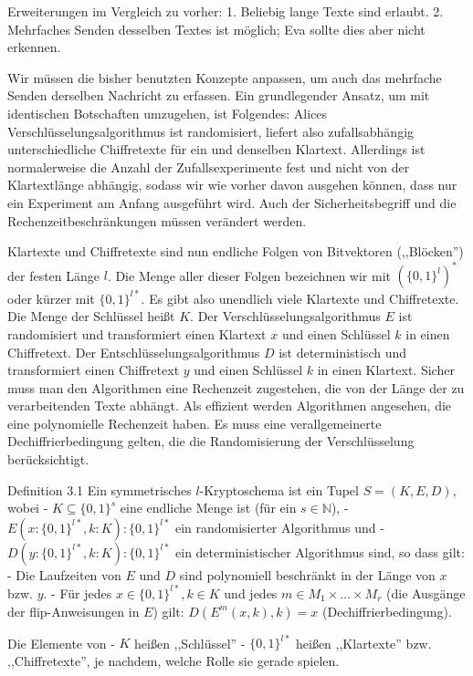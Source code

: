 \documentclass[a4paper]{article}
\begin{document}
\begin{multicols}{3}
    Erweiterungen im Vergleich zu vorher:
    1. Beliebig lange Texte sind erlaubt.
    2. Mehrfaches Senden desselben Textes ist möglich; Eva sollte dies aber nicht erkennen.

    Wir müssen die bisher benutzten Konzepte anpassen, um auch das mehrfache Senden derselben Nachricht zu erfassen. Ein grundlegender Ansatz, um mit identischen Botschaften umzugehen, ist Folgendes: Alices Verschlüsselungsalgorithmus ist randomisiert, liefert also zufallsabhängig unterschiedliche Chiffretexte für ein und denselben Klartext. Allerdings ist normalerweise die Anzahl der Zufallsexperimente fest und nicht von der Klartextlänge abhängig, sodass wir wie vorher davon ausgehen können, dass nur ein Experiment am Anfang ausgeführt wird. Auch der Sicherheitsbegriff und die Rechenzeitbeschränkungen müssen verändert werden.

    Klartexte und Chiffretexte sind nun endliche Folgen von Bitvektoren (,,Blöcken'') der festen Länge $l$. Die Menge aller dieser Folgen bezeichnen wir mit $(\{0,1\}^l)^*$ oder kürzer mit $\{0,1\}^{l*}$. Es gibt also unendlich viele Klartexte und Chiffretexte. Die Menge der Schlüssel heißt $K$. Der Verschlüsselungsalgorithmus $E$ ist randomisiert und transformiert einen Klartext $x$ und einen Schlüssel $k$ in einen Chiffretext. Der Entschlüsselungsalgorithmus $D$ ist deterministisch und transformiert einen Chiffretext $y$ und einen Schlüssel $k$ in einen Klartext. Sicher muss man den Algorithmen eine Rechenzeit zugestehen, die von der Länge der zu verarbeitenden Texte abhängt. Als effizient werden Algorithmen angesehen, die eine polynomielle Rechenzeit haben. Es muss eine verallgemeinerte Dechiffrierbedingung gelten, die die Randomisierung der Verschlüsselung berücksichtigt.

    Definition 3.1 Ein symmetrisches $l$-Kryptoschema ist ein Tupel $S= (K,E,D)$, wobei
    - $K\subseteq\{0,1\}^s$ eine endliche Menge ist (für ein $s\in\mathbb{N}$),
    - $E(x:\{0,1\}^{l*},k:K) :\{0,1\}^{l*}$ ein randomisierter Algorithmus und
    - $D(y:\{0,1\}^{l*},k:K) :\{0,1\}^{l*}$ ein deterministischer Algorithmus
    sind, so dass gilt:
    - Die Laufzeiten von $E$ und $D$ sind polynomiell beschränkt in der Länge von $x$ bzw. $y$.
    - Für jedes $x\in\{0,1\}^{l*},k\in K$ und jedes $m\in M_1\times...\times M_r$ (die Ausgänge der flip-Anweisungen in $E$) gilt: $D(E^m(x,k),k)=x$ (Dechiffrierbedingung).

    Die Elemente von
    - $K$ heißen ,,Schlüssel''
    - $\{0,1\}^{l*}$ heißen ,,Klartexte'' bzw. ,,Chiffretexte'', je nachdem, welche Rolle sie gerade spielen.


\end{multicols}
\end{document}
